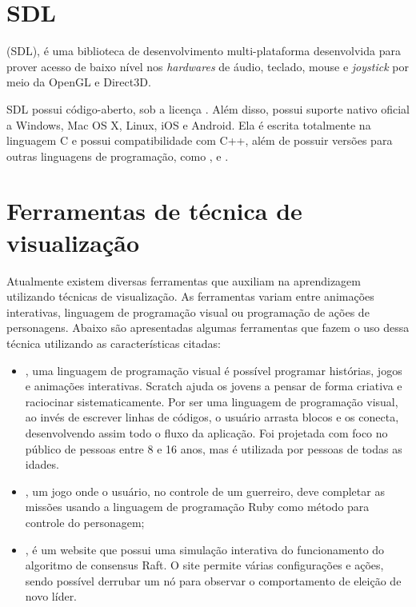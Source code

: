 \documentclass[12pt, %
openright,
oneside, %
a4paper,    %
brazil]{facom-ufu-abntex2}
\begin{document}
\section{SDL}
 (SDL), é uma biblioteca de desenvolvimento multi-plataforma desenvolvida para prover acesso de baixo nível nos \textit{hardwares} de áudio, teclado, mouse e \textit{joystick} por meio da OpenGL e Direct3D.

SDL possui código-aberto, sob a licença . Além disso, possui suporte nativo oficial a Windows, Mac OS X, Linux, iOS e Android. Ela é escrita totalmente na linguagem C e possui compatibilidade com C++, além de possuir versões para outras linguagens de programação, como ,  e .

\section{Ferramentas de técnica de visualização}
Atualmente existem diversas ferramentas que auxiliam na aprendizagem utilizando técnicas de visualização. As ferramentas variam entre animações interativas, linguagem de programação visual ou programação de ações de personagens. Abaixo são apresentadas algumas ferramentas que fazem o uso dessa técnica utilizando as características citadas:

\begin{itemize}

    \item {}, uma linguagem de programação visual é possível programar histórias, jogos e animações interativas. Scratch ajuda os jovens a pensar de forma criativa e raciocinar sistematicamente. Por ser uma linguagem de programação visual, ao invés de escrever linhas de códigos, o usuário arrasta blocos e os conecta, desenvolvendo assim todo o fluxo da aplicação. Foi projetada com foco no público de pessoas entre 8 e 16 anos, mas é utilizada por pessoas de todas as idades.

    \item {}, um jogo onde o usuário, no controle de um guerreiro, deve completar as missões usando a linguagem de programação Ruby como método para controle do personagem;

    \item {}, é um website que possui uma simulação interativa do funcionamento do algoritmo de consensus Raft. O site permite várias configurações e ações, sendo possível derrubar um nó para observar o comportamento de eleição de novo líder.

\end{itemize}
\end{document}
